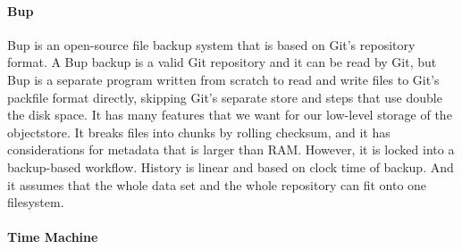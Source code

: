 \paragraph{Bup}\label{related_bup}

Bup \cite{bup_homepage} is an open-source file backup system that is based on
Git's repository format. A Bup backup is a valid Git repository and it can be
read by Git, but Bup is a separate program written from scratch to read and
write files to Git's \gls{packfile} format directly, skipping Git's separate
store and  steps that use double the disk space. It has
many features that we want for our low-level storage of the \gls{objectstore}.
It breaks files into chunks by rolling checksum, and it has considerations for
metadata that is larger than RAM. However, it is locked into a backup-based
workflow. History is linear and based on clock time of backup. And it assumes
that the whole data set and the whole repository can fit onto one filesystem.


\paragraph{Time Machine}

